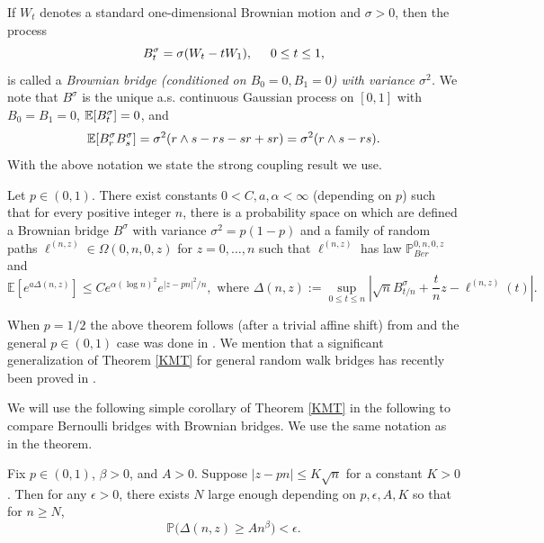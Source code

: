 If $W_t$ denotes a standard one-dimensional Brownian motion and $\sigma > 0$, then the process
$$B^{\sigma}_t = \sigma (W_t - t W_1), \hspace{5mm} 0 \leq t \leq 1,$$
is called a {\em Brownian bridge (conditioned on $B_0 = 0, B_1 = 0$) with variance $\sigma^2$.} We note that $B^\sigma$ is the unique a.s. continuous Gaussian process on $[0,1]$ with $B_0 = B_1  = 0$, $\mathbb{E}[B^\sigma_t] = 0$, and
\begin{equation}\label{BBcovar}
\mathbb{E}[B^\sigma_r B^\sigma_s] = \sigma^2(r\wedge s - rs - sr + sr) = \sigma^2 (r\wedge s - rs).
\end{equation}  
With the above notation we state the strong coupling result we use.
\begin{theorem}\label{KMT}
Let $p \in (0,1)$. There exist constants $0 < C, a, \alpha < \infty$ (depending on $p$) such that for every positive integer $n$, there is a probability space on which are defined a Brownian bridge $B^\sigma$ with variance $\sigma^2 = p(1-p)$ and a family of random paths $\ell^{(n,z)} \in \Omega(0,n, 0, z)$ for $z = 0,\dots,n$ such that $\ell^{(n,z)}$ has law $\mathbb{P}^{0,n,0,z}_{Ber}$ and
\begin{equation}\label{KMTeq}
\mathbb{E}\left[ e^{a \Delta(n,z)} \right] \leq C e^{\alpha (\log n)^2}e^{|z- p n|^2/n}, \mbox{ where $\Delta(n,z):=  \sup_{0 \leq t \leq n} \left| \sqrt{n} B^\sigma_{t/n} + \frac{t}{n}z - \ell^{(n,z)}(t) \right|.$}
\end{equation}
\end{theorem}
\begin{remark} When $p = 1/2$ the above theorem follows (after a trivial affine shift) from \cite[Theorem 6.3]{LF} and the general $p \in (0,1)$ case was done in \cite[Theorem 4.5]{CD}. We mention that a significant generalization of Theorem \ref{KMT} for general random walk bridges has recently been proved in \cite[Theorem 2.3]{DW19}.
\end{remark}

We will use the following simple corollary of Theorem \ref{KMT} in the following to compare Bernoulli bridges with Brownian bridges. We use the same notation as in the theorem.

\begin{corollary}\label{Cheb}
	Fix $p\in (0,1)$, $\beta > 0$, and $A>0$. Suppose $|z-pn| \leq K\sqrt{n}$ for a constant $K>0$. Then for any $\epsilon > 0$, there exists $N$ large enough depending on $p,\epsilon,A,K$ so that for $n\geq N$,
	\[
	\mathbb{P}\Big(\Delta(n,z) \geq An^\beta\Big) < \epsilon.
	\]
\end{corollary}


